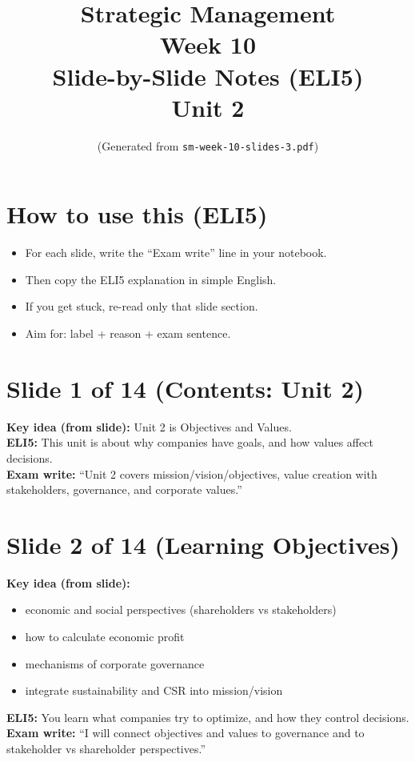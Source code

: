 \documentclass[11pt,a4paper]{article}
\title{Strategic Management \\ Week 10 \\ Slide-by-Slide Notes (ELI5) \\ Unit 2}
\author{(Generated from \texttt{sm-week-10-slides-3.pdf})}
\date{}
\begin{document}
\maketitle

\section*{How to use this (ELI5)}
\begin{itemize}
  \item For each slide, write the ``Exam write'' line in your notebook.
  \item Then copy the ELI5 explanation in simple English.
  \item If you get stuck, re-read only that slide section.
  \item Aim for: label + reason + exam sentence.
\end{itemize}

\section*{Slide 1 of 14 (Contents: Unit 2)}
\textbf{Key idea (from slide):} Unit 2 is Objectives and Values.\\
\textbf{ELI5:} This unit is about why companies have goals, and how values affect decisions.\\
\textbf{Exam write:} ``Unit 2 covers mission/vision/objectives, value creation with stakeholders, governance, and corporate values.''

\section*{Slide 2 of 14 (Learning Objectives)}
\textbf{Key idea (from slide):}
\begin{itemize}
  \item economic and social perspectives (shareholders vs stakeholders)
  \item how to calculate economic profit
  \item mechanisms of corporate governance
  \item integrate sustainability and CSR into mission/vision
\end{itemize}
\textbf{ELI5:} You learn what companies try to optimize, and how they control decisions.\\
\textbf{Exam write:} ``I will connect objectives and values to governance and to stakeholder vs shareholder perspectives.''
\end{document}
